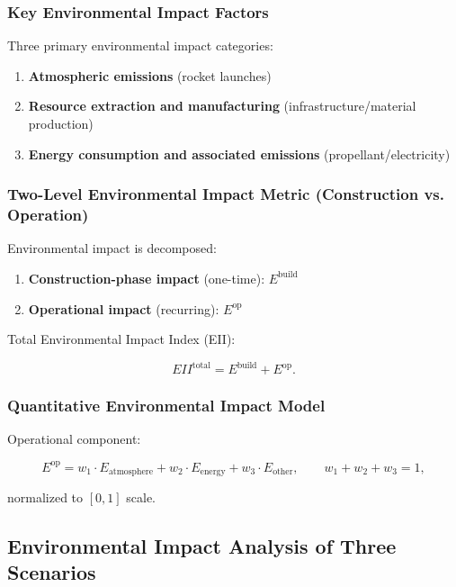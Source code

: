 \documentclass[12pt]{mcmthesis}
\begin{document}
\subsubsection{Key Environmental Impact Factors}

Three primary environmental impact categories:
\begin{enumerate}
    \item \textbf{Atmospheric emissions} (rocket launches)
    \item \textbf{Resource extraction and manufacturing} (infrastructure/material production)
    \item \textbf{Energy consumption and associated emissions} (propellant/electricity)
\end{enumerate}

\subsubsection{Two-Level Environmental Impact Metric (Construction vs. Operation)}

Environmental impact is decomposed:
\begin{enumerate}
    \item \textbf{Construction-phase impact} (one-time): $E^{\text{build}}$
    \item \textbf{Operational impact} (recurring): $E^{\text{op}}$
\end{enumerate}

Total Environmental Impact Index (EII):

\vspace{-10pt}
\[
    EII^{\text{total}} = E^{\text{build}} + E^{\text{op}}.
    \label{eq:eii_total_decomp}
\]
\vspace{-10pt}

\subsubsection{Quantitative Environmental Impact Model}

Operational component:

\vspace{-10pt}
\[
    E^{\text{op}} = w_1 \cdot E_{\text{atmosphere}} + w_2 \cdot E_{\text{energy}} + w_3 \cdot E_{\text{other}},
    \qquad
    w_1+w_2+w_3=1,
\]
\vspace{-10pt}

normalized to $[0,1]$ scale.

\subsection{Environmental Impact Analysis of Three Scenarios}
\end{document}
